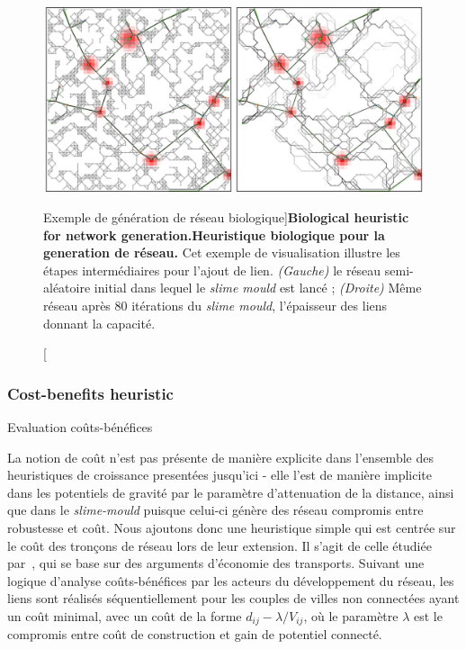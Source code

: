\begin{figure}
\includegraphics[width=\linewidth]{Figures/Final/7-1-1-fig-networkgrowth-bioexample.jpg}
\caption[Biological Network Example][Exemple de génération de réseau biologique]{\textbf{Biological heuristic for network generation.}\label{fig:networkgrowth:bioexample}}{\textbf{Heuristique biologique pour la generation de réseau.} Cet exemple de visualisation illustre les étapes intermédiaires pour l'ajout de lien. \textit{(Gauche)} le réseau semi-aléatoire initial dans lequel le \emph{slime mould} est lancé ; \textit{(Droite)} Même réseau après 80 itérations du \emph{slime mould}, l'épaisseur des liens donnant la capacité.\label{fig:networkgrowth:bioexample}}
\end{figure}


\subsubsection{Cost-benefits heuristic}{Evaluation coûts-bénéfices}

La notion de coût n'est pas présente de manière explicite dans l'ensemble des heuristiques de croissance presentées jusqu'ici - elle l'est de manière implicite dans les potentiels de gravité par le paramètre d'attenuation de la distance, ainsi que dans le \emph{slime-mould} puisque celui-ci génère des réseau compromis entre robustesse et coût. Nous ajoutons donc une heuristique simple qui est centrée sur le coût des tronçons de réseau lors de leur extension. Il s'agit de celle étudiée par~\cite{louf2013emergence}, qui se base sur des arguments d'économie des transports. Suivant une logique d'analyse coûts-bénéfices par les acteurs du développement du réseau, les liens sont réalisés séquentiellement pour les couples de villes non connectées ayant un coût minimal, avec un coût de la forme $d_{ij} - \lambda / V_{ij}$, où le paramètre $\lambda$ est le compromis entre coût de construction et gain de potentiel connecté.


